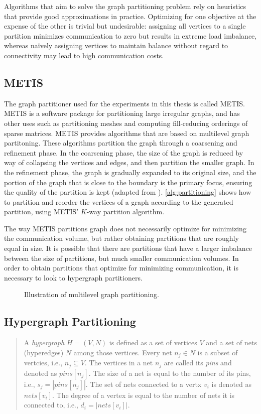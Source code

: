 Algorithms that aim to solve the graph partitioning problem rely on heuristics that provide good approximations in practice. Optimizing for one objective at the expense of the other is trivial but undesirable: assigning all vertices to a single partition minimizes communication to zero but results in extreme load imbalance, whereas naïvely assigning vertices to maintain balance without regard to connectivity may lead to high communication costs.

\subsection{METIS}
The graph partitioner used for the experiments in this thesis is called METIS. METIS is a software package for partitioning large irregular graphs, and has other uses such as partitioning meshes and computing fill-reducing orderings of sparse matrices. METIS provides algorithms that are based on multilevel graph partitoning. These algorithms partition the graph through a coarsening and refinement phase. In the coarsening phase, the size of the graph is reduced by way of collapsing the vertices and edges, and then partition the smaller graph. In the refinement phase, the graph is gradually expanded to its original size, and the portion of the graph that is close to the boundary is the primary focus, ensuring the quality of the partition is kept (adapted from \cite{karypis1997metis}). \autoref{alg:partitioning} shows how to partition and reorder the vertices of a graph according to the generated partition, using METIS' \(K\)-way partition algorithm.
\medskip

The way METIS partitions graph does not necessarily optimize for minimizing the communication volume, but rather obtaining partitions that are roughly equal in size. It is possible that there are partitions that have a larger imbalance between the size of partitions, but much smaller communication volumes. In order to obtain partitions that optimize for minimizing communication, it is necessary to look to hypergraph partitioners.

\begin{figure}[H]
    \centering
    \caption{Illustration of multilevel graph partitioning.}
    \label{fig:coarseninggraph}
\end{figure}

\subsection{Hypergraph Partitioning}
\begin{quote}
    A \emph{hypergraph} \(H = (V,N)\) is defined as a set of vertices \(V\) and a set of nets (hyperedges) \(N\) among those vertices. Every net \(n_{j} \in N\) is a subset of vertcies, i.e., \(n_{j} \subseteq V\). The vertices in a net \(n_{j}\) are called its \textit{pins} and denoted as \(pins[n_{j}]\). The size of a net is equal to the number of its pins, i.e., \(s_{j} = \left|  pins[n_{j}] \right|\). The set of nets connected to a vertx \(v_{i}\) is denoted as \(nets[v_{i}]\). The degree of a vertex is equal to the number of nets it is connected to, i.e., \(d_{i} = \left| nets[v_{i}] \right|\).
\end{quote}

